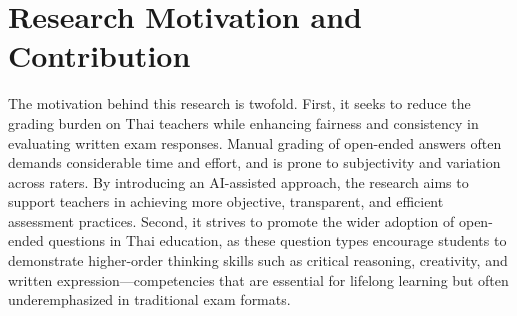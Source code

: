 \section{Research Motivation and Contribution}




The motivation behind this research is twofold. First, it 
seeks to reduce the grading burden on Thai teachers while 
enhancing fairness and consistency in evaluating written exam 
responses. Manual grading of open-ended answers often demands 
considerable time and effort, and is prone to subjectivity 
and variation across raters. By introducing an AI-assisted 
approach, the research aims to support teachers in achieving 
more objective, transparent, and efficient assessment 
practices. Second, it strives to promote the wider adoption 
of open-ended questions in Thai education, as these question 
types encourage students to demonstrate higher-order thinking 
skills such as critical reasoning, creativity, and written 
expression—competencies that are essential for lifelong 
learning but often underemphasized in traditional exam 
formats.

